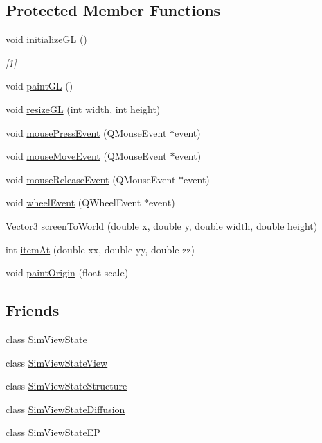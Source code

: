 \subsection*{Protected Member Functions}
\begin{DoxyCompactItemize}
\item 
void \hyperlink{classgl_atrium_a6fc7ea9064a492b562c0858eb3c44f86}{initialize\+G\+L} ()
\begin{DoxyCompactList}\small\item\em \mbox{[}1\mbox{]} \end{DoxyCompactList}\item 
void \hyperlink{classgl_atrium_a951d4caaef073f6762ddd47a409d2cf6}{paint\+G\+L} ()
\item 
void \hyperlink{classgl_atrium_a40cd7c018c743e5738560fdb4e4fea59}{resize\+G\+L} (int width, int height)
\item 
void \hyperlink{classgl_atrium_af0e47f4d5e0bc6d8cdcf16dd23c0487b}{mouse\+Press\+Event} (Q\+Mouse\+Event $\ast$event)
\item 
void \hyperlink{classgl_atrium_ad5af63d41d959d40d475d8e1aa0f6e9e}{mouse\+Move\+Event} (Q\+Mouse\+Event $\ast$event)
\item 
void \hyperlink{classgl_atrium_a3b2fff6d451823faa28b1b5f09aa384d}{mouse\+Release\+Event} (Q\+Mouse\+Event $\ast$event)
\item 
void \hyperlink{classgl_atrium_a5a4eb4614e6619d55a484cdfb733b2ea}{wheel\+Event} (Q\+Wheel\+Event $\ast$event)
\item 
Vector3 \hyperlink{classgl_atrium_a939d7c7a5289deeeea1763544e5be6b5}{screen\+To\+World} (double x, double y, double width, double height)
\item 
int \hyperlink{classgl_atrium_a02590feb7cd82c82cc67d0697136baf4}{item\+At} (double xx, double yy, double zz)
\item 
void \hyperlink{classgl_atrium_aff81827e3285b74bea0e3777a75393db}{paint\+Origin} (float scale)
\end{DoxyCompactItemize}
\subsection*{Friends}
\begin{DoxyCompactItemize}
\item 
class \hyperlink{classgl_atrium_a9879084bed338fc174a8d2fe04996ce3}{Sim\+View\+State}
\item 
class \hyperlink{classgl_atrium_a3784e26d08f8db67d4187df43944ad76}{Sim\+View\+State\+View}
\item 
class \hyperlink{classgl_atrium_a05f31e8af7a8b263cc06dbc57b20f144}{Sim\+View\+State\+Structure}
\item 
class \hyperlink{classgl_atrium_a1f495b2c4e91f752b635ad082004df63}{Sim\+View\+State\+Diffusion}
\item 
class \hyperlink{classgl_atrium_a76eb2c10fcf71ef86e90466fa0becdcb}{Sim\+View\+State\+E\+P}
\end{DoxyCompactItemize}


